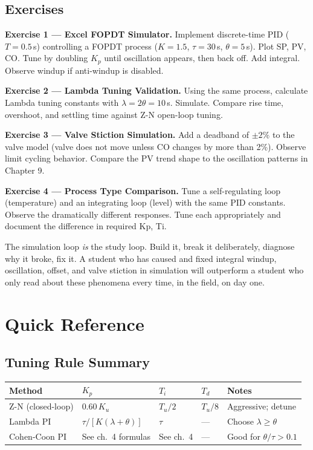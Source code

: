 \documentclass[12pt,twoside,openright]{memoir}
\begin{document}
\section{Exercises}

\textbf{Exercise 1 --- Excel FOPDT Simulator.}
Implement discrete-time PID ($T = 0.5$\,s) controlling a FOPDT process ($K=1.5$, $\tau=30$\,s, $\theta=5$\,s). Plot SP, PV, CO. Tune by doubling $K_p$ until oscillation appears, then back off. Add integral. Observe windup if anti-windup is disabled.

\textbf{Exercise 2 --- Lambda Tuning Validation.}
Using the same process, calculate Lambda tuning constants with $\lambda = 2\theta = 10$\,s. Simulate. Compare rise time, overshoot, and settling time against Z-N open-loop tuning.

\textbf{Exercise 3 --- Valve Stiction Simulation.}
Add a deadband of $\pm 2\%$ to the valve model (valve does not move unless CO changes by more than 2\%). Observe limit cycling behavior. Compare the PV trend shape to the oscillation patterns in Chapter 9.

\textbf{Exercise 4 --- Process Type Comparison.}
Tune a self-regulating loop (temperature) and an integrating loop (level) with the same PID constants. Observe the dramatically different responses. Tune each appropriately and document the difference in required Kp, Ti.

\begin{fieldnote}
The simulation loop \emph{is} the study loop. Build it, break it deliberately, diagnose why it broke, fix it. A student who has caused and fixed integral windup, oscillation, offset, and valve stiction in simulation will outperform a student who only read about these phenomena every time, in the field, on day one.
\end{fieldnote}

\backmatter

\appendix
\chapter{Quick Reference}

\section{Tuning Rule Summary}

\begin{center}
\begin{tabular}{@{}L{3cm}C{2.5cm}C{2.5cm}C{2.5cm}C{3cm}@{}}
\toprule
{}
\textbf{Method} & $K_p$ & $T_i$ & $T_d$ & \textbf{Notes} \\
\midrule
Z-N (closed-loop) & $0.60\,K_u$ & $T_u/2$ & $T_u/8$ & Aggressive; detune \\
Lambda PI & $\tau/[K(\lambda+\theta)]$ & $\tau$ & --- & Choose $\lambda \geq \theta$ \\
Cohen-Coon PI & See ch.\ 4 formulas & See ch.\ 4 & --- & Good for $\theta/\tau > 0.1$ \\
\bottomrule
\end{tabular}
\end{center}
\end{document}
